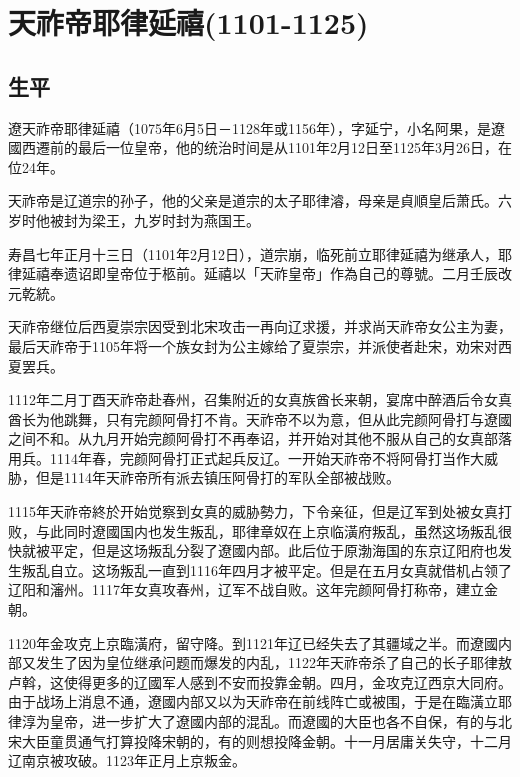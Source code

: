 
\section{天祚帝耶律延禧\tiny(1101-1125)}

\subsection{生平}

遼天祚帝耶律延禧（1075年6月5日－1128年或1156年），字延宁，小名阿果，是遼國西遷前的最后一位皇帝，他的统治时间是从1101年2月12日至1125年3月26日，在位24年。

天祚帝是辽道宗的孙子，他的父亲是道宗的太子耶律濬，母亲是貞順皇后萧氏。六岁时他被封为梁王，九岁时封为燕国王。

寿昌七年正月十三日（1101年2月12日），道宗崩，临死前立耶律延禧为继承人，耶律延禧奉遗诏即皇帝位于柩前。延禧以「天祚皇帝」作為自己的尊號。二月壬辰改元乾統。

天祚帝继位后西夏崇宗因受到北宋攻击一再向辽求援，并求尚天祚帝女公主为妻，最后天祚帝于1105年将一个族女封为公主嫁给了夏崇宗，并派使者赴宋，劝宋对西夏罢兵。

1112年二月丁酉天祚帝赴春州，召集附近的女真族酋长来朝，宴席中醉酒后令女真酋长为他跳舞，只有完颜阿骨打不肯。天祚帝不以为意，但从此完颜阿骨打与遼國之间不和。从九月开始完颜阿骨打不再奉诏，并开始对其他不服从自己的女真部落用兵。1114年春，完颜阿骨打正式起兵反辽。一开始天祚帝不将阿骨打当作大威胁，但是1114年天祚帝所有派去镇压阿骨打的军队全部被战败。

1115年天祚帝終於开始觉察到女真的威胁勢力，下令亲征，但是辽军到处被女真打败，与此同时遼國国内也发生叛乱，耶律章奴在上京临潢府叛乱，虽然这场叛乱很快就被平定，但是这场叛乱分裂了遼國内部。此后位于原渤海国的东京辽阳府也发生叛乱自立。这场叛乱一直到1116年四月才被平定。但是在五月女真就借机占领了辽阳和瀋州。1117年女真攻春州，辽军不战自败。这年完颜阿骨打称帝，建立金朝。

1120年金攻克上京臨潢府，留守降。到1121年辽已经失去了其疆域之半。而遼國内部又发生了因为皇位继承问题而爆发的内乱，1122年天祚帝杀了自己的长子耶律敖卢斡，这使得更多的辽國军人感到不安而投靠金朝。四月，金攻克辽西京大同府。由于战场上消息不通，遼國内部又以为天祚帝在前线阵亡或被围，于是在臨潢立耶律淳为皇帝，进一步扩大了遼國内部的混乱。而遼國的大臣也各不自保，有的与北宋大臣童贯通气打算投降宋朝的，有的则想投降金朝。十一月居庸关失守，十二月辽南京被攻破。1123年正月上京叛金。

